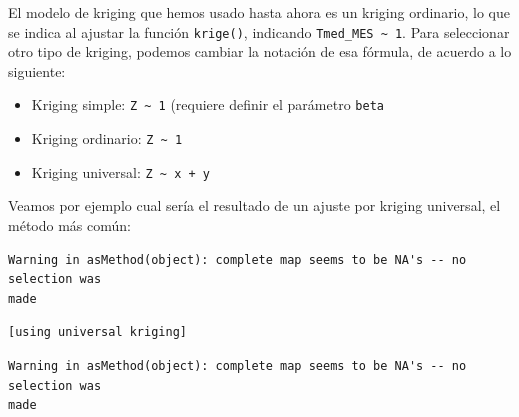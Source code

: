 \documentclass[
  letterpaper,
  DIV=11,
  numbers=noendperiod]{scrreprt}
\newenvironment{Shaded}{\begin{snugshade}}{\end{snugshade}}
\newcommand{\AttributeTok}[1]{\textcolor[rgb]{0.40,0.45,0.13}{#1}}
\newcommand{\DecValTok}[1]{\textcolor[rgb]{0.68,0.00,0.00}{#1}}
\newcommand{\FunctionTok}[1]{\textcolor[rgb]{0.28,0.35,0.67}{#1}}
\newcommand{\NormalTok}[1]{\textcolor[rgb]{0.00,0.23,0.31}{#1}}
\newcommand{\OtherTok}[1]{\textcolor[rgb]{0.00,0.23,0.31}{#1}}
\newcommand{\SpecialCharTok}[1]{\textcolor[rgb]{0.37,0.37,0.37}{#1}}
\newcommand{\StringTok}[1]{\textcolor[rgb]{0.13,0.47,0.30}{#1}}
\providecommand{\tightlist}{%
  \setlength{\itemsep}{0pt}\setlength{\parskip}{0pt}}\usepackage{longtable,booktabs,array}
\begin{document}
El modelo de kriging que hemos usado hasta ahora es un kriging
ordinario, lo que se indica al ajustar la función \texttt{krige()},
indicando \texttt{Tmed\_MES\ \textasciitilde{}\ 1}. Para seleccionar
otro tipo de kriging, podemos cambiar la notación de esa fórmula, de
acuerdo a lo siguiente:

\begin{itemize}
\tightlist
\item
  Kriging simple: \texttt{Z\ \textasciitilde{}\ 1} (requiere definir el
  parámetro \texttt{beta}
\item
  Kriging ordinario: \texttt{Z\ \textasciitilde{}\ 1}
\item
  Kriging universal: \texttt{Z\ \textasciitilde{}\ x\ +\ y}
\end{itemize}

Veamos por ejemplo cual sería el resultado de un ajuste por kriging
universal, el método más común:

\begin{Shaded}
\end{Shaded}

\begin{verbatim}
Warning in asMethod(object): complete map seems to be NA's -- no selection was
made
\end{verbatim}

\begin{verbatim}
[using universal kriging]
\end{verbatim}

\begin{verbatim}
Warning in asMethod(object): complete map seems to be NA's -- no selection was
made
\end{verbatim}

\begin{Shaded}
\end{Shaded}
\end{document}
